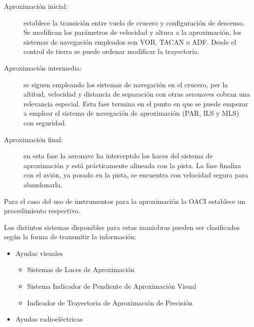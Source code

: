 \begin{description}
\item [Aproximación inicial:] establece la transición entre vuelo de
  crucero y configuración de descenso. Se modifican los parámetros
  de velocidad y altura a la aproximación, los sistemas de navegación
  empleados son VOR, TACAN o ADF. Desde el control de tierra se puede
  ordenar modificar la trayectoria.
  
\item [Aproximación intermedia:] se
  siguen empleando los sistemas de navegación en el crucero, per la
  altitud, velocidad y distancia de separación con otras aeronaves
  cobran una relevancia especial. Esta fase termina en el punto en que
  se puede empezar a emplear el sistema de navegación de aproximación
  (PAR, ILS y MLS) con seguridad.
  
\item [Aproximación final:] en esta fase la
  aeronave ha interceptdo los haces del sistema de aproximación y
  está prácticamente alineada con la pista. La fase finaliza con el
  avión, ya posado en la pista, se encuentra con velocidad segura para
  abandonarla.
\end{description}

Para el caso del uso de instrumentos para la aproximación la OACI establece un procedimiento respectivo.


Los distintos sistemas disponibles para estas maniobras pueden ser clasificados según la forma de transmitir la información:

\begin{itemize}
\item Ayudas visuales
  \begin{itemize}
  \item Sistemas de Luces de Aproximación
  \item Sistema  Indicador de Pendiente de Aproximación Visual
  \item Indicador de Trayectoria de Aproximación de Precisión
  \end{itemize}
\item Ayudas radioeléctricas
\end{itemize}

